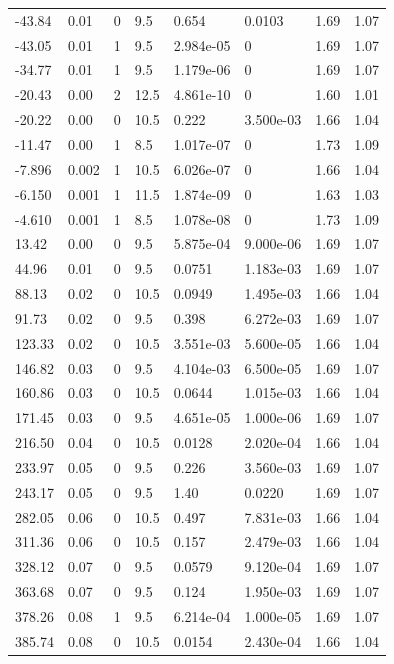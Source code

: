 \documentclass[preview]{standalone}
\begin{document}
{{\begin{tabular}{L{1.2cm}C{1.2cm} C{0.3cm}C{0.5cm} C{1.4cm}C{1.4cm} C{1.4cm}C{1.4cm}}
  -43.84  &  0.01  & 0     & 9.5 &  0.654  & 0.0103  & 1.69 &  1.07   \\ 
  -43.05  &  0.01  & 1     & 9.5 &  2.984e-05  & 0  & 1.69 &  1.07   \\ 
  -34.77  &  0.01  & 1     & 9.5 &  1.179e-06  & 0  & 1.69 &  1.07   \\ 
  -20.43  &  0.00  & 2     & 12.5 &  4.861e-10  & 0  & 1.60 &  1.01   \\ 
  -20.22  &  0.00  & 0     & 10.5 &  0.222  & 3.500e-03  & 1.66 &  1.04   \\ 
  -11.47  &  0.00  & 1     & 8.5 &  1.017e-07  & 0  & 1.73 &  1.09   \\ 
  -7.896  &  0.002  & 1     & 10.5 &  6.026e-07  & 0  & 1.66 &  1.04   \\ 
  -6.150  &  0.001  & 1     & 11.5 &  1.874e-09  & 0  & 1.63 &  1.03   \\ 
  -4.610  &  0.001  & 1     & 8.5 &  1.078e-08  & 0  & 1.73 &  1.09   \\ 
  13.42  &  0.00  & 0     & 9.5 &  5.875e-04  & 9.000e-06  & 1.69 &  1.07   \\ 
  44.96  &  0.01  & 0     & 9.5 &  0.0751  & 1.183e-03  & 1.69 &  1.07   \\ 
  88.13  &  0.02  & 0     & 10.5 &  0.0949  & 1.495e-03  & 1.66 &  1.04   \\ 
  91.73  &  0.02  & 0     & 9.5 &  0.398  & 6.272e-03  & 1.69 &  1.07   \\ 
  123.33  &  0.02  & 0     & 10.5 &  3.551e-03  & 5.600e-05  & 1.66 &  1.04   \\ 
  146.82  &  0.03  & 0     & 9.5 &  4.104e-03  & 6.500e-05  & 1.69 &  1.07   \\ 
  160.86  &  0.03  & 0     & 10.5 &  0.0644  & 1.015e-03  & 1.66 &  1.04   \\ 
  171.45  &  0.03  & 0     & 9.5 &  4.651e-05  & 1.000e-06  & 1.69 &  1.07   \\ 
  216.50  &  0.04  & 0     & 10.5 &  0.0128  & 2.020e-04  & 1.66 &  1.04   \\ 
  233.97  &  0.05  & 0     & 9.5 &  0.226  & 3.560e-03  & 1.69 &  1.07   \\ 
  243.17  &  0.05  & 0     & 9.5 &  1.40  & 0.0220  & 1.69 &  1.07   \\ 
  282.05  &  0.06  & 0     & 10.5 &  0.497  & 7.831e-03  & 1.66 &  1.04   \\ 
  311.36  &  0.06  & 0     & 10.5 &  0.157  & 2.479e-03  & 1.66 &  1.04   \\ 
  328.12  &  0.07  & 0     & 9.5 &  0.0579  & 9.120e-04  & 1.69 &  1.07   \\ 
  363.68  &  0.07  & 0     & 9.5 &  0.124  & 1.950e-03  & 1.69 &  1.07   \\ 
  378.26  &  0.08  & 1     & 9.5 &  6.214e-04  & 1.000e-05  & 1.69 &  1.07   \\ 
  385.74  &  0.08  & 0     & 10.5 &  0.0154  & 2.430e-04  & 1.66 &  1.04   \\ 
\hline 
\end{tabular} 

}}
\end{document}
